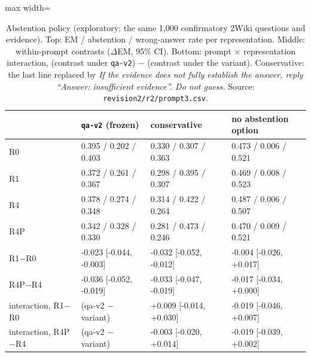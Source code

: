 \begin{table}[t]
\centering
\footnotesize
\begin{adjustbox}{max width=\linewidth}
\begin{tabular}{@{}llll@{}}
\toprule
 & \texttt{qa-v2} (frozen) & conservative & no abstention option \\
\midrule
R0 & 0.395 / 0.202 / 0.403 & 0.330 / 0.307 / 0.363 & 0.473 / 0.006 / 0.521 \\
R1 & 0.372 / 0.261 / 0.367 & 0.298 / 0.395 / 0.307 & 0.469 / 0.008 / 0.523 \\
R4 & 0.378 / 0.274 / 0.348 & 0.314 / 0.422 / 0.264 & 0.487 / 0.006 / 0.507 \\
R4P & 0.342 / 0.328 / 0.330 & 0.281 / 0.473 / 0.246 & 0.470 / 0.009 / 0.521 \\
\midrule
R1$-$R0 & -0.023 [-0.044, -0.003] & -0.032 [-0.052, -0.012] & -0.004 [-0.026, +0.017] \\
R4P$-$R4 & -0.036 [-0.052, -0.019] & -0.033 [-0.047, -0.019] & -0.017 [-0.034, +0.000] \\
interaction, R1$-$R0 & (qa-v2 $-$ variant) & +0.009 [-0.014, +0.030] & -0.019 [-0.046, +0.007] \\
interaction, R4P$-$R4 & (qa-v2 $-$ variant) & -0.003 [-0.020, +0.014] & -0.019 [-0.039, +0.002] \\
\bottomrule
\end{tabular}
\end{adjustbox}
\caption{Abstention policy (exploratory; the same 1{,}000 confirmatory 2Wiki questions and evidence). Top: EM / abstention / wrong-answer rate per representation. Middle: within-prompt contrasts ($\Delta$EM, 95\% CI). Bottom: prompt $\times$ representation interaction, (contrast under \texttt{qa-v2}) $-$ (contrast under the variant). Conservative: the last line replaced by \emph{If the evidence does not fully establish the answer, reply ``Answer: insufficient evidence''. Do not guess.} Source: \texttt{revision2/\allowbreak r2/\allowbreak prompt3.csv}.}
\label{tab:prompt3}
\end{table}
